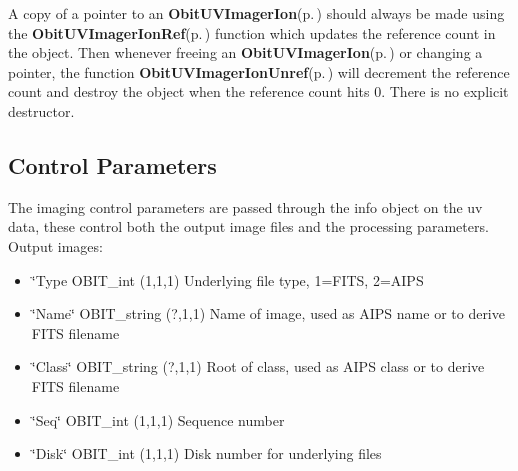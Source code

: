 A copy of a pointer to an {\bf Obit\-UVImager\-Ion}{\rm (p.\,\pageref{structObitUVImagerIon})} should always be made using the {\bf Obit\-UVImager\-Ion\-Ref}{\rm (p.\,\pageref{ObitUVImagerIon_8h_a1})} function which updates the reference count in the object. Then whenever freeing an {\bf Obit\-UVImager\-Ion}{\rm (p.\,\pageref{structObitUVImagerIon})} or changing a pointer, the function {\bf Obit\-UVImager\-Ion\-Unref}{\rm (p.\,\pageref{ObitUVImagerIon_8h_a0})} will decrement the reference count and destroy the object when the reference count hits 0. There is no explicit destructor.\subsection{Control Parameters}\label{ObitUVImagerIon_8h_ObitUVImagerIonparameters}
The imaging control parameters are passed through the info object on the uv data, these control both the output image files and the processing parameters. Output images: \begin{itemize}
\item \char`\"{}Type OBIT\_\-int (1,1,1) Underlying file type, 1=FITS, 2=AIPS \item \char`\"{}Name\char`\"{} OBIT\_\-string (?,1,1) Name of image, used as AIPS name or to derive FITS filename \item \char`\"{}Class\char`\"{} OBIT\_\-string (?,1,1) Root of class, used as AIPS class or to derive FITS filename \item \char`\"{}Seq\char`\"{} OBIT\_\-int (1,1,1) Sequence number \item \char`\"{}Disk\char`\"{} OBIT\_\-int (1,1,1) Disk number for underlying files\end{itemize}
